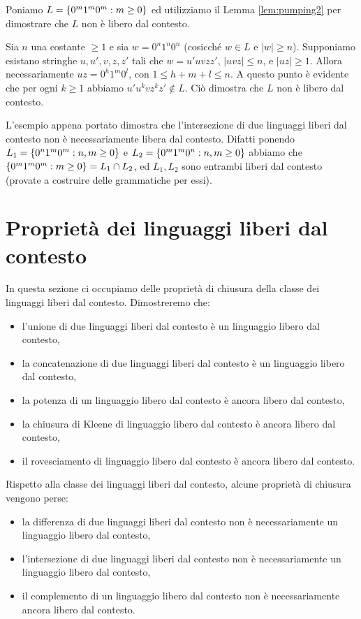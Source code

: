 \documentclass[runningheads,a4paper]{llncs}
\begin{document}
Poniamo $L = \{0^m1^m0^m : m \geq 0\}$ ed utilizziamo il Lemma \ref{lem:pumping2} per dimostrare che $L$ non \`{e} libero dal contesto.

Sia $n$ una costante $\geq 1$ e sia $w = 0^n1^n0^n$ (cosicch\'{e} $w \in L$ e $|w| \geq n$). Supponiamo esistano stringhe $u,u',v,z,z'$ tali che $w = u'uvzz'$, $|uvz| \leq n$, e $|uz| \geq 1$. Allora necessariamente $uz=0^h1^m0^l$, con $1 \leq h+m+l \leq n$. A questo punto \`{e} evidente che per ogni $k \geq 1$ abbiamo $u'u^kvz^kz' \not\in L$. Ci\`{o} dimostra che $L$ non \`{e} libero dal contesto.

L'esempio appena portato dimostra che l'intersezione di due linguaggi liberi dal contesto non \`{e} necessariamente libera dal contesto. Difatti ponendo $L_1 = \{0^n1^m0^m : n,m \geq 0\}$ e $L_2 = \{0^m1^m0^n : n,m \geq 0\}$ abbiamo che $\{0^m1^m0^m : m \geq 0\} = L_1 \cap L_2$, ed $L_1,L_2$ sono entrambi liberi dal contesto (provate a costruire delle grammatiche per essi).

\section{Propriet\`{a} dei linguaggi liberi dal contesto}

In questa sezione ci occupiamo delle propriet\`{a} di chiusura della classe dei linguaggi liberi dal contesto. Dimostreremo che:
\begin{itemize}
\item l'unione di due linguaggi liberi dal contesto \`{e} un linguaggio libero dal contesto,
\item la concatenazione di due linguaggi liberi dal contesto \`{e} un linguaggio libero dal contesto,
\item la potenza di un linguaggio libero dal contesto \`{e} ancora libero dal contesto,
\item la chiusura di Kleene di linguaggio libero dal contesto \`{e} ancora libero dal contesto,
\item il rovesciamento di linguaggio libero dal contesto \`{e} ancora libero dal contesto.
\end{itemize}

Rispetto alla classe dei linguaggi liberi dal contesto, alcune propriet\`{a} di chiusura vengono perse:
\begin{itemize}
\item la differenza di due linguaggi liberi dal contesto non \`{e} necessariamente un linguaggio libero dal contesto,
\item l'intersezione di due linguaggi liberi dal contesto non \`{e} necessariamente un linguaggio libero dal contesto,
\item il complemento di un linguaggio libero dal contesto non \`{e} necessariamente ancora libero dal contesto.
\end{itemize}
\end{document}
